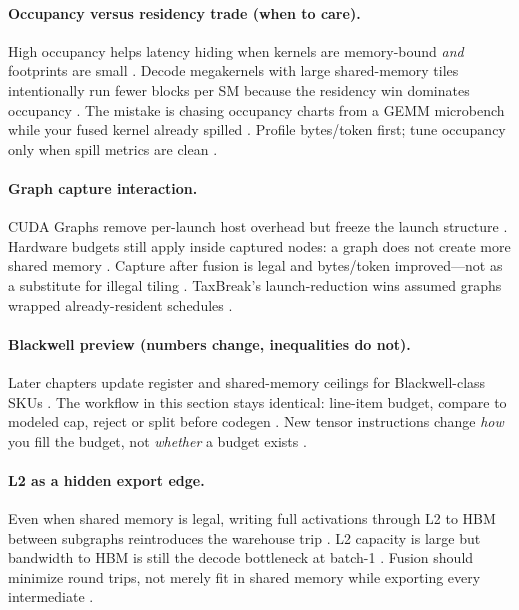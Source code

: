 \paragraph{Occupancy versus residency trade (when to care).}
High occupancy helps latency hiding when kernels are memory-bound \emph{and} footprints are small \citep{nvidia2022hopper}.
Decode megakernels with large shared-memory tiles intentionally run fewer blocks per SM because the residency win dominates occupancy \citep{memoryfloor2026,dao2022flashattention}.
The mistake is chasing occupancy charts from a GEMM microbench while your fused kernel already spilled \citep{yirage2026}.
Profile bytes/token first; tune occupancy only when spill metrics are clean \citep{taxbreak2026}.

\paragraph{Graph capture interaction.}
CUDA Graphs remove per-launch host overhead but freeze the launch structure \citep{nvidia2024cudagraphs,taxbreak2026}.
Hardware budgets still apply inside captured nodes: a graph does not create more shared memory \citep{nvidia2022hopper,memoryfloor2026}.
Capture after fusion is legal and bytes/token improved---not as a substitute for illegal tiling \citep{yirage2026,chen2020compilerbasedhardw}.
TaxBreak's launch-reduction wins assumed graphs wrapped already-resident schedules \citep{taxbreak2026,memoryfloor2026}.

\paragraph{Blackwell preview (numbers change, inequalities do not).}
Later chapters update register and shared-memory ceilings for Blackwell-class SKUs \citep{nvidia2022hopper,yirage2026}.
The workflow in this section stays identical: line-item budget, compare to modeled cap, reject or split before codegen \citep{chen2020compilerbasedhardw,patel2025llminference}.
New tensor instructions change \emph{how} you fill the budget, not \emph{whether} a budget exists \citep{semianalysis2024tma,shah2024flashattention3}.

\paragraph{L2 as a hidden export edge.}
Even when shared memory is legal, writing full activations through L2 to HBM between subgraphs reintroduces the warehouse trip \citep{memoryfloor2026,kwon2023vllm}.
L2 capacity is large but bandwidth to HBM is still the decode bottleneck at batch-1 \citep{nvidia2022hopper}.
Fusion should minimize round trips, not merely fit in shared memory while exporting every intermediate \citep{chen2020compilerbasedhardw}.

